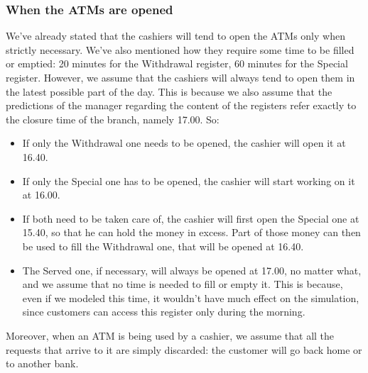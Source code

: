 \documentclass{article}
\begin{document}
\subsubsection{When the ATMs are opened}
We've already stated that the cashiers will tend to open the ATMs only when strictly necessary. We've also mentioned how they require some time to be filled or emptied: 20 minutes for the Withdrawal register, 60 minutes for the Special register. However, we assume that the cashiers will always tend to open them in the latest possible part of the day. This is because we also assume that the predictions of the manager regarding the content of the registers refer exactly to the closure time of the branch, namely 17.00. So:
\begin{itemize}
    \item If only the Withdrawal one needs to be opened, the cashier will open it at 16.40.
    \item If only the Special one has to be opened, the cashier will start working on it at 16.00.
    \item If both need to be taken care of, the cashier will first open the Special one at 15.40, so that he can hold the money in excess. Part of those money can then be used to fill the Withdrawal one, that will be opened at 16.40.
    \item The Served one, if necessary, will always be opened at 17.00, no matter what, and we assume that no time is needed to fill or empty it. This is because, even if we modeled this time, it wouldn't have much effect on the simulation, since customers can access this register only during the morning.
\end{itemize}
Moreover, when an ATM is being used by a cashier, we assume that all the requests that arrive to it are simply discarded: the customer will go back home or to another bank.
\end{document}
